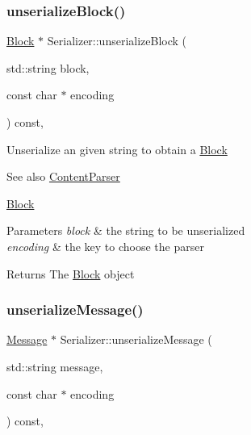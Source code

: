 \subsubsection{\texorpdfstring{unserialize\+Block()}{unserializeBlock()}}
{\footnotesize\ttfamily \mbox{\hyperlink{classBlock}{Block}} $\ast$ Serializer\+::unserialize\+Block (\begin{DoxyParamCaption}\item[{std\+::string}]{block,  }\item[{const char $\ast$}]{encoding }\end{DoxyParamCaption}) const\hspace{0.3cm}{\ttfamily [virtual]}, {\ttfamily [inherited]}}

Unserialize an given string to obtain a \mbox{\hyperlink{classBlock}{Block}} \begin{DoxySeeAlso}{See also}
\mbox{\hyperlink{classContentParser}{Content\+Parser}} 

\mbox{\hyperlink{classBlock}{Block}}
\end{DoxySeeAlso}

\begin{DoxyParams}{Parameters}
{\em block} & the string to be unserialized \\
\hline
{\em encoding} & the key to choose the parser \\
\hline
\end{DoxyParams}
\begin{DoxyReturn}{Returns}
The \mbox{\hyperlink{classBlock}{Block}} object 
\end{DoxyReturn}
\mbox{\label{classSerializer_a1d16df9f35a7580da06a497dfbddffe8}} 
\subsubsection{\texorpdfstring{unserialize\+Message()}{unserializeMessage()}}
{\footnotesize\ttfamily \mbox{\hyperlink{classMessage}{Message}} $\ast$ Serializer\+::unserialize\+Message (\begin{DoxyParamCaption}\item[{std\+::string}]{message,  }\item[{const char $\ast$}]{encoding }\end{DoxyParamCaption}) const\hspace{0.3cm}{\ttfamily [virtual]}, {\ttfamily [inherited]}}

